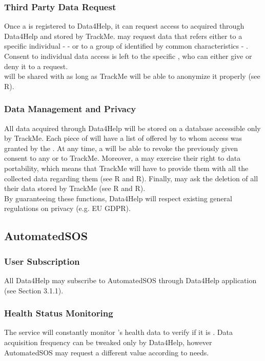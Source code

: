 \documentclass[../../rasd.tex]{subfiles}
\begin{document}
		\subsubsection{Third Party Data Request}
		Once a  is registered to Data4Help, it can request access to  acquired through Data4Help and stored by TrackMe.  may request data that refers either to a specific individual -  - or to a group of  identified by common characteristics - .\\
		Consent to individual data access is left to the specific , who can either give or deny it to a  request.\\
		 will be shared with  as long as TrackMe will be able to anonymize it properly (see R).

		\subsubsection{Data Management and Privacy}
		All data acquired through Data4Help will be stored on a database accessible only by TrackMe. Each piece of  will have a list of  offered by  to whom access was granted by the . At any time, a  will be able to revoke the previously given consent to any  or to TrackMe. Moreover, a  may exercise their right to data portability, which means that TrackMe will have to provide them with all the collected data regarding them (see R and R). Finally,  may ask the deletion of all their data stored by TrackMe (see R and R).\\
		By guaranteeing these functions, Data4Help will respect existing general regulations on privacy (e.g. EU GDPR).
	
	\subsection{AutomatedSOS}
		
		\subsubsection{User Subscription}
		All Data4Help  may subscribe to AutomatedSOS through Data4Help application (see Section 3.1.1).
		
		\subsubsection{Health Status Monitoring}
		The service will constantly monitor 's health data to verify if it is . Data acquisition frequency can be tweaked only by Data4Help, however AutomatedSOS may request a different value according to  needs.
		
\end{document}

